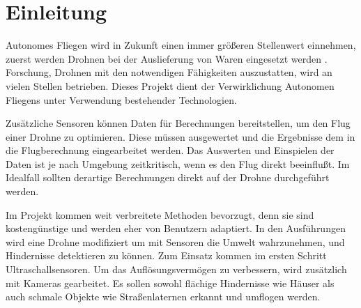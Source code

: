 
\chapter{Einleitung}
Autonomes Fliegen wird in Zukunft einen immer größeren Stellenwert einnehmen, zuerst werden Drohnen bei der Auslieferung von Waren eingesetzt werden \cite{auterionltdHomeDroneDelivery2022}. Forschung, Drohnen mit den notwendigen Fähigkeiten auszustatten, wird an vielen Stellen betrieben. Dieses Projekt dient der Verwirklichung Autonomen Fliegens unter Verwendung bestehender Technologien.\newline

Zusätzliche Sensoren können Daten für Berechnungen bereitstellen, um den Flug einer Drohne zu optimieren. Diese müssen ausgewertet und die Ergebnisse dem in die Flugberechnung eingearbeitet werden. Das Auswerten und Einspielen der Daten ist je nach Umgebung zeitkritisch, wenn es den Flug direkt beeinflußt. Im Idealfall sollten derartige Berechnungen direkt auf der Drohne durchgeführt werden.\newline

Im Projekt kommen weit verbreitete Methoden bevorzugt, denn sie sind kostengünstige und werden eher von Benutzern adaptiert. In den Ausführungen wird eine Drohne modifiziert um mit Sensoren die Umwelt wahrzunehmen, und Hindernisse detektieren zu können. Zum Einsatz kommen im ersten Schritt Ultraschallsensoren. Um das Auflösungsvermögen zu verbessern, wird zusätzlich mit Kameras gearbeitet. Es sollen sowohl flächige Hindernisse wie Häuser als auch schmale Objekte wie Straßenlaternen erkannt und umflogen werden.

